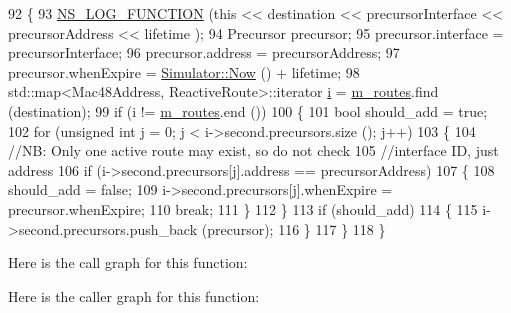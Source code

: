 \begin{DoxyCode}
92 \{
93   \hyperlink{log-macros-disabled_8h_a90b90d5bad1f39cb1b64923ea94c0761}{NS\_LOG\_FUNCTION} (\textcolor{keyword}{this} << destination << precursorInterface << precursorAddress << lifetime
      );
94   Precursor precursor;
95   precursor.interface = precursorInterface;
96   precursor.address = precursorAddress;
97   precursor.whenExpire = \hyperlink{classns3_1_1Simulator_ac3178fa975b419f7875e7105be122800}{Simulator::Now} () + lifetime;
98   std::map<Mac48Address, ReactiveRoute>::iterator \hyperlink{bernuolliDistribution_8m_a6f6ccfcf58b31cb6412107d9d5281426}{i} = \hyperlink{classns3_1_1dot11s_1_1HwmpRtable_a72afac5a0c979b3d4f160786ef865eab}{m\_routes}.find (destination);
99   \textcolor{keywordflow}{if} (i != \hyperlink{classns3_1_1dot11s_1_1HwmpRtable_a72afac5a0c979b3d4f160786ef865eab}{m\_routes}.end ())
100     \{
101       \textcolor{keywordtype}{bool} should\_add = \textcolor{keyword}{true};
102       \textcolor{keywordflow}{for} (\textcolor{keywordtype}{unsigned} \textcolor{keywordtype}{int} j = 0; j < i->second.precursors.size (); j++)
103         \{
104           \textcolor{comment}{//NB: Only one active route may exist, so do not check}
105           \textcolor{comment}{//interface ID, just address}
106           \textcolor{keywordflow}{if} (i->second.precursors[j].address == precursorAddress)
107             \{
108               should\_add = \textcolor{keyword}{false};
109               i->second.precursors[j].whenExpire = precursor.whenExpire;
110               \textcolor{keywordflow}{break};
111             \}
112         \}
113       \textcolor{keywordflow}{if} (should\_add)
114         \{
115           i->second.precursors.push\_back (precursor);
116         \}
117     \}
118 \}
\end{DoxyCode}


Here is the call graph for this function\+:




Here is the caller graph for this function\+:



